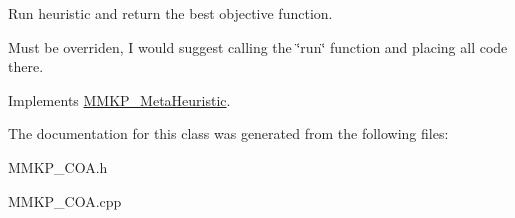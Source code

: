 Run heuristic and return the best objective function. 

Must be overriden, I would suggest calling the \char`\"{}run\char`\"{} function and placing all code there. 

Implements \hyperlink{class_m_m_k_p___meta_heuristic_acc3de42187c16d4a31776e18135035e5}{M\+M\+K\+P\+\_\+\+Meta\+Heuristic}.



The documentation for this class was generated from the following files\+:\begin{DoxyCompactItemize}
\item 
M\+M\+K\+P\+\_\+\+C\+O\+A.\+h\item 
M\+M\+K\+P\+\_\+\+C\+O\+A.\+cpp\end{DoxyCompactItemize}
